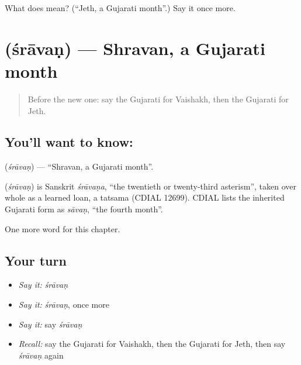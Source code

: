 \begin{tcolorbox}[breakable,colback=teal!4,colframe=teal!35!black,title={Before you move on}]
What does  mean? (\textquotedblleft{}Jeth, a Gujarati month\textquotedblright{}.) Say it once more.
\end{tcolorbox}
\section[\texorpdfstring{\gu{શ્રાવણ} (śrāvaṇ)}{શ્રાવણ (śrāvaṇ)}]{ (śrāvaṇ) — Shravan, a Gujarati month}

\label{lesson:GU-C98-sravan}



\begin{quote}
Before the new one: say the Gujarati for Vaishakh, then the Gujarati for Jeth.
\end{quote}

\subsection*{You'll want to know: }
\textbf{} (\emph{śrāvaṇ}) — \textquotedblleft{}Shravan, a Gujarati month\textquotedblright{}.

\begin{cousinweb}
\textbf{} (\emph{śrāvaṇ}) is Sanskrit \emph{śrāvaṇa}, \textquotedblleft{}the twentieth or twenty-third asterism\textquotedblright{}, taken over whole as a learned loan, a tatsama (CDIAL 12699). CDIAL lists the inherited Gujarati form as \emph{sāvaṇ}, \textquotedblleft{}the fourth month\textquotedblright{}.
\end{cousinweb}

\begin{grammarlens}[title={What you've built}]
One more word for this chapter.
\end{grammarlens}

\subsection*{Your turn}
\begin{itemize}
\raggedright
  \item \emph{Say it:} \emph{śrāvaṇ}
  \item \emph{Say it:} \emph{śrāvaṇ}, once more
  \item \emph{Say it:} say \emph{śrāvaṇ}
  \item \emph{Recall:} say the Gujarati for Vaishakh, then the Gujarati for Jeth, then say \emph{śrāvaṇ} again
\end{itemize}

